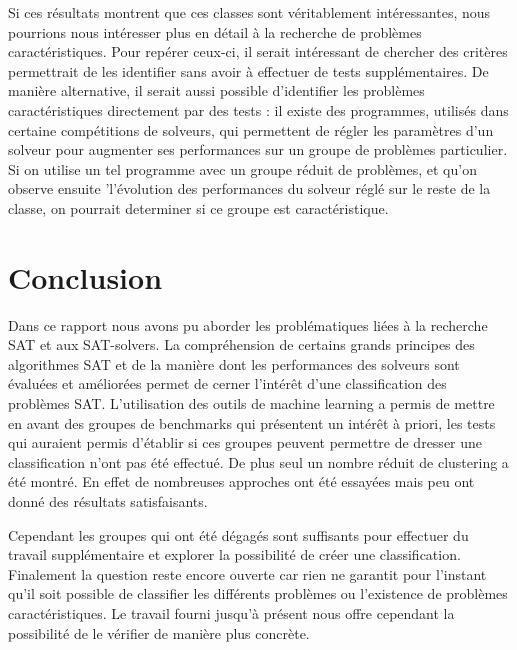 \documentclass[a4paper,11pt]{article}
\begin{document}
Si ces résultats montrent que ces classes sont véritablement intéressantes, nous pourrions nous intéresser plus en détail à la recherche de problèmes caractéristiques. Pour repérer ceux-ci, il serait intéressant 
de chercher des critères permettrait de les identifier sans avoir à effectuer de tests supplémentaires. De manière alternative, il serait aussi possible d'identifier les problèmes caractéristiques directement par 
des tests : il existe des programmes, utilisés dans certaine compétitions de solveurs, qui permettent de régler les paramètres d'un solveur pour augmenter ses performances sur un groupe de problèmes particulier. 
Si on utilise un tel programme avec un groupe réduit de problèmes, et qu'on observe ensuite 'l'évolution des performances du solveur réglé sur le reste de la classe, on pourrait determiner si ce groupe est caractéristique.

\section{Conclusion}
\label{sec:conclusion}
Dans ce rapport nous avons pu aborder les problématiques liées à la recherche SAT et aux SAT-solvers. La compréhension de certains grands principes des algorithmes SAT et de la manière dont les performances des 
solveurs sont évaluées et améliorées permet de cerner l’intérêt d'une classification des problèmes SAT. L'utilisation des outils de machine learning a permis de mettre en avant des groupes de benchmarks qui 
présentent un intérêt à priori, les tests qui auraient permis d'établir si ces groupes peuvent permettre de dresser une classification  n'ont pas été effectué.
De plus seul un nombre réduit de clustering a été montré. En effet de nombreuses approches ont été essayées mais peu ont donné des résultats satisfaisants. 

Cependant les groupes qui ont été dégagés sont suffisants pour effectuer du travail supplémentaire et explorer la possibilité de créer une classification. Finalement la question reste encore ouverte car rien ne 
garantit pour l'instant qu'il soit possible de classifier les différents problèmes ou l'existence de problèmes caractéristiques. Le travail fourni jusqu'à présent nous offre cependant la possibilité de le vérifier 
de manière plus concrète.

\begin{otherlanguage}{english}
\printbibliography
\end{otherlanguage}
\end{document}
